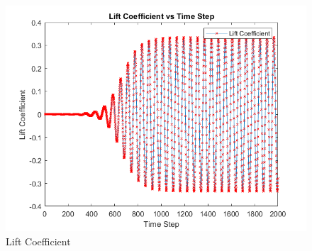 \documentclass[a4paper,12pt]{article} %
\begin{document}
\begin{figure}[htbp]
    \center
    \includegraphics[scale=0.6]{Cd.png}
    \caption{Lift Coefficient}
\end{figure}
\end{document}
